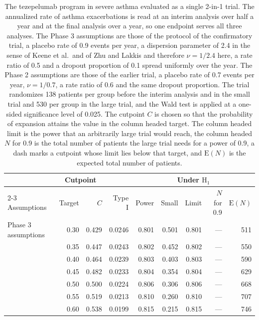 \begin{table}[htbp]
\centering
\caption{The tezepelumab program in severe asthma evaluated as a single 2-in-1 trial. The annualized rate of asthma exacerbations is read at an interim analysis over half a year and at the final analysis over a year, so one endpoint serves all three analyses. The Phase 3 assumptions are those of the protocol of the confirmatory trial, a placebo rate of 0.9 events per year, a dispersion parameter of 2.4 in the sense of Keene et al.\ and of Zhu and Lakkis and therefore $\nu = 1 / 2.4$ here, a rate ratio of 0.5 and a dropout proportion of 0.1 spread uniformly over the year. The Phase 2 assumptions are those of the earlier trial, a placebo rate of 0.7 events per year, $\nu = 1 / 0.7$, a rate ratio of 0.6 and the same dropout proportion. The trial randomizes 138 patients per group before the interim analysis and in the small trial and 530 per group in the large trial, and the Wald test is applied at a one-sided significance level of 0.025. The cutpoint $C$ is chosen so that the probability of expansion attains the value in the column headed target. The column headed limit is the power that an arbitrarily large trial would reach, the column headed $N$ for 0.9 is the total number of patients the large trial needs for a power of 0.9, a dash marks a cutpoint whose limit lies below that target, and $\mathrm{E}(N)$ is the expected total number of patients.}
\label{tab:real}
\vspace{0.6em}
\footnotesize
\renewcommand{\arraystretch}{0.85}
\setlength{\tabcolsep}{3pt}
\begin{tabular}{lrrrrrrrr}
\hline
 & \multicolumn{2}{c}{Cutpoint} &  & \multicolumn{5}{c}{Under $\mathrm{H}_1$} \\
\cline{2-3}\cline{5-9}
Assumptions & Target & $C$ & Type I & Power & Small & Limit & $N$ for 0.9 & $\mathrm{E}(N)$ \\
\hline
Phase 3 assumptions & 0.30 & 0.429 & 0.0246 & 0.801 & 0.501 & 0.801 & --- & 511 \\
 & 0.35 & 0.447 & 0.0243 & 0.802 & 0.452 & 0.802 & --- & 550 \\
 & 0.40 & 0.464 & 0.0239 & 0.803 & 0.403 & 0.803 & --- & 590 \\
 & 0.45 & 0.482 & 0.0233 & 0.804 & 0.354 & 0.804 & --- & 629 \\
 & 0.50 & 0.500 & 0.0224 & 0.806 & 0.306 & 0.806 & --- & 668 \\
 & 0.55 & 0.519 & 0.0213 & 0.810 & 0.260 & 0.810 & --- & 707 \\
 & 0.60 & 0.538 & 0.0199 & 0.815 & 0.215 & 0.815 & --- & 746 \\

\end{tabular}
\end{table}
